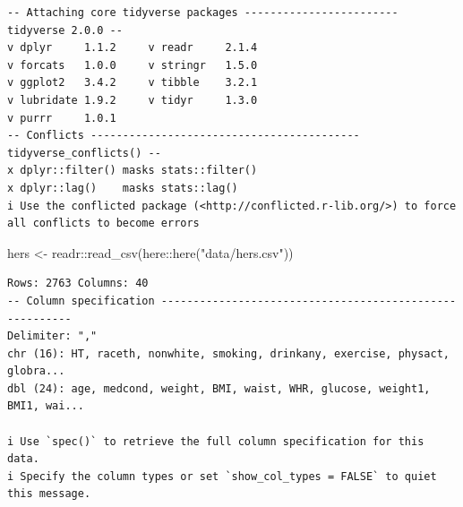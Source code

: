 \documentclass[
  letterpaper,
  DIV=11,
  numbers=noendperiod]{scrreport}
\newenvironment{Shaded}{\begin{snugshade}}{\end{snugshade}}
\newcommand{\FunctionTok}[1]{\textcolor[rgb]{0.28,0.35,0.67}{#1}}
\newcommand{\NormalTok}[1]{\textcolor[rgb]{0.00,0.23,0.31}{#1}}
\newcommand{\OtherTok}[1]{\textcolor[rgb]{0.00,0.23,0.31}{#1}}
\newcommand{\SpecialCharTok}[1]{\textcolor[rgb]{0.37,0.37,0.37}{#1}}
\newcommand{\StringTok}[1]{\textcolor[rgb]{0.13,0.47,0.30}{#1}}
\begin{document}
\begin{verbatim}
-- Attaching core tidyverse packages ------------------------ tidyverse 2.0.0 --
v dplyr     1.1.2     v readr     2.1.4
v forcats   1.0.0     v stringr   1.5.0
v ggplot2   3.4.2     v tibble    3.2.1
v lubridate 1.9.2     v tidyr     1.3.0
v purrr     1.0.1     
-- Conflicts ------------------------------------------ tidyverse_conflicts() --
x dplyr::filter() masks stats::filter()
x dplyr::lag()    masks stats::lag()
i Use the conflicted package (<http://conflicted.r-lib.org/>) to force all conflicts to become errors
\end{verbatim}

\begin{Shaded}
\begin{Highlighting}[]
\NormalTok{hers }\OtherTok{\textless{}{-}}\NormalTok{ readr}\SpecialCharTok{::}\FunctionTok{read\_csv}\NormalTok{(here}\SpecialCharTok{::}\FunctionTok{here}\NormalTok{(}\StringTok{"data/hers.csv"}\NormalTok{))}
\end{Highlighting}
\end{Shaded}

\begin{verbatim}
Rows: 2763 Columns: 40
-- Column specification --------------------------------------------------------
Delimiter: ","
chr (16): HT, raceth, nonwhite, smoking, drinkany, exercise, physact, globra...
dbl (24): age, medcond, weight, BMI, waist, WHR, glucose, weight1, BMI1, wai...

i Use `spec()` to retrieve the full column specification for this data.
i Specify the column types or set `show_col_types = FALSE` to quiet this message.
\end{verbatim}
\end{document}

